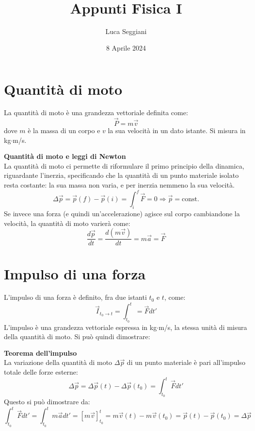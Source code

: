 \documentclass[a4paper,12pt]{article}
\title{Appunti Fisica I}
\author{Luca Seggiani}
\date{8 Aprile 2024}
\begin{document}
\maketitle
\section{Quantità di moto}
La quantità di moto è una grandezza vettoriale definita come:
$$ \vec{P} = m\vec{v} $$
dove $m$ è la massa di un corpo e $v$ la sua velocità in un dato istante. Si misura in 
kg$\cdot$m/s.
\par\smallskip
\textbf{Quantità di moto e leggi di Newton} \\
La quantità di moto ci permette di riformulare il primo principio della dinamica, riguardante l'inerzia, specificando che
la quantità di un punto materiale isolato resta costante: la sua massa non varia, e per inerzia nemmeno la sua velocità.
$$ \Delta \vec{p} = \vec{p}(f) - \vec{p}(i) = \int_i^f \vec{F} = 0 \Rightarrow \vec{p} = \mathrm{const.} $$
Se invece una forza (e quindi un'accelerazione) agisce sul corpo cambiandone la velocità, la quantità di moto varierà come:
$$ \frac{d\vec{p}}{dt} = \frac{d(m\vec{v})}{dt} = m\vec{a} = \vec{F} $$
\section{Impulso di una forza}
L'impulso di una forza è definito, fra due istanti $t_0$ e $t$, come:
$$ \vec{I}_{t_0\rightarrow t} = \int_{t_0}^t = \vec{F}dt' $$
L'impulso è una grandezza vettoriale espressa in kg$\cdot$m/s, la stessa unità di misura della quantità di
moto. Si può quindi dimostrare:
\par\smallskip
\textbf{Teorema dell'impulso} \\
La variazione della quantità di moto $\Delta \vec{p}$ di un punto materiale è pari all'impulso totale delle forze esterne:
$$ \Delta \vec{p} = \Delta \vec{p}(t) - \Delta \vec{p}(t_0) = \int_{t_0}^t \vec{F} dt'$$
Questo si può dimostrare da:
$$ \int_{t_0}^t \vec{F}dt' = \int_{t_0}^t m\vec{a}dt' = [m\vec{v}]_{t_0}^t = m\vec{v}(t) - m\vec{v}(t_0) = \vec{p}(t) - \vec{p}(t_0) = \Delta \vec{p}$$
\end{document}
